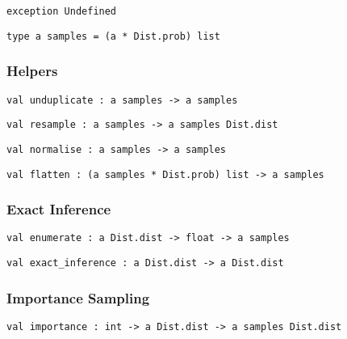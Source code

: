 \protect\hyperlink{exception-Undefined}{}\texttt{exception\ }\texttt{Undefined}

\protect\hyperlink{type-samples}{}\texttt{type\ \textquotesingle{}a\ samples}\texttt{\ =\ (\textquotesingle{}a\ *\ Dist.prob)\ list}

\hypertarget{infux5fhelpers}{\subsubsection{\texorpdfstring{\protect\hyperlink{infux5fhelpers}{}Helpers}{Helpers}}\label{infux5fhelpers}}

\protect\hyperlink{val-unduplicate}{}\texttt{val\ unduplicate\ :\ \textquotesingle{}a\ samples\ -\textgreater{}\ \textquotesingle{}a\ samples}

\protect\hyperlink{val-resample}{}\texttt{val\ resample\ :\ \textquotesingle{}a\ samples\ -\textgreater{}\ \textquotesingle{}a\ samples\ Dist.dist}

\protect\hyperlink{val-normalise}{}\texttt{val\ normalise\ :\ \textquotesingle{}a\ samples\ -\textgreater{}\ \textquotesingle{}a\ samples}

\protect\hyperlink{val-flatten}{}\texttt{val\ flatten\ :\ (\textquotesingle{}a\ samples\ *\ Dist.prob)\ list\ -\textgreater{}\ \textquotesingle{}a\ samples}

\hypertarget{infux5fexact}{\subsubsection{\texorpdfstring{\protect\hyperlink{infux5fexact}{}Exact
Inference}{Exact Inference}}\label{infux5fexact}}

\protect\hyperlink{val-enumerate}{}\texttt{val\ enumerate\ :\ \textquotesingle{}a\ Dist.dist\ -\textgreater{}\ float\ -\textgreater{}\ \textquotesingle{}a\ samples}

\protect\hyperlink{val-exactux5finference}{}\texttt{val\ exact\_inference\ :\ \textquotesingle{}a\ Dist.dist\ -\textgreater{}\ \textquotesingle{}a\ Dist.dist}

\hypertarget{infux5fimp}{\subsubsection{\texorpdfstring{\protect\hyperlink{infux5fimp}{}Importance
Sampling}{Importance Sampling}}\label{infux5fimp}}

\protect\hyperlink{val-importance}{}\texttt{val\ importance\ :\ int\ -\textgreater{}\ \textquotesingle{}a\ Dist.dist\ -\textgreater{}\ \textquotesingle{}a\ samples\ Dist.dist}

